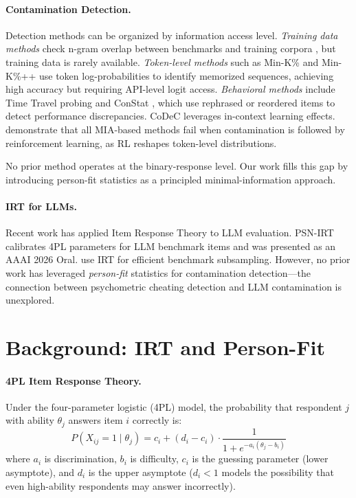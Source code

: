 \documentclass[11pt,a4paper]{article}
\begin{document}
\paragraph{Contamination Detection.}
Detection methods can be organized by information access level. \emph{Training data methods} check n-gram overlap between benchmarks and training corpora \citep{brown2020language,dodge2021documenting}, but training data is rarely available. \emph{Token-level methods} such as Min-K\% \citep{shi2024detecting} and Min-K\%++ use token log-probabilities to identify memorized sequences, achieving high accuracy but requiring API-level logit access. \emph{Behavioral methods} include Time Travel probing \citep{dong2024generalization} and ConStat \citep{li2024constat}, which use rephrased or reordered items to detect performance discrepancies. CoDeC \citep{wu2026codec} leverages in-context learning effects. \citet{wang2025contamination} demonstrate that all MIA-based methods fail when contamination is followed by reinforcement learning, as RL reshapes token-level distributions.

No prior method operates at the binary-response level. Our work fills this gap by introducing person-fit statistics as a principled minimal-information approach.

\paragraph{IRT for LLMs.}
Recent work has applied Item Response Theory to LLM evaluation. PSN-IRT \citep{gu2024psnirt} calibrates 4PL parameters for LLM benchmark items and was presented as an AAAI 2026 Oral. \citet{polo2024tinybenchmarks} use IRT for efficient benchmark subsampling. However, no prior work has leveraged \emph{person-fit} statistics for contamination detection---the connection between psychometric cheating detection and LLM contamination is unexplored.


\section{Background: IRT and Person-Fit}
\label{sec:background}

\paragraph{4PL Item Response Theory.}
Under the four-parameter logistic (4PL) model, the probability that respondent $j$ with ability $\theta_j$ answers item $i$ correctly is:
\begin{equation}
P(X_{ij}=1 \mid \theta_j) = c_i + (d_i - c_i) \cdot \frac{1}{1 + e^{-a_i(\theta_j - b_i)}}
\label{eq:4pl}
\end{equation}
where $a_i$ is discrimination, $b_i$ is difficulty, $c_i$ is the guessing parameter (lower asymptote), and $d_i$ is the upper asymptote ($d_i < 1$ models the possibility that even high-ability respondents may answer incorrectly).
\end{document}

